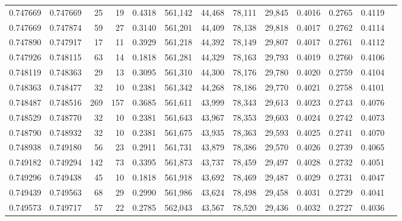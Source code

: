 \begin{tabular}{rrrrrrrrrrrrr}
0.747669 & 0.747669 &    25 &  19 &                                     0.4318 & 561,142 &  44,468 &  78,111 &  29,845 & 0.4016 & 0.2765 & 0.4119 \\
0.747669 & 0.747874 &    59 &  27 &                                     0.3140 & 561,201 &  44,409 &  78,138 &  29,818 & 0.4017 & 0.2762 & 0.4114 \\
0.747890 & 0.747917 &    17 &  11 &                                     0.3929 & 561,218 &  44,392 &  78,149 &  29,807 & 0.4017 & 0.2761 & 0.4112 \\
0.747926 & 0.748115 &    63 &  14 &                                     0.1818 & 561,281 &  44,329 &  78,163 &  29,793 & 0.4019 & 0.2760 & 0.4106 \\
0.748119 & 0.748363 &    29 &  13 &                                     0.3095 & 561,310 &  44,300 &  78,176 &  29,780 & 0.4020 & 0.2759 & 0.4104 \\
0.748363 & 0.748477 &    32 &  10 &                                     0.2381 & 561,342 &  44,268 &  78,186 &  29,770 & 0.4021 & 0.2758 & 0.4101 \\
0.748487 & 0.748516 &   269 & 157 &                                     0.3685 & 561,611 &  43,999 &  78,343 &  29,613 & 0.4023 & 0.2743 & 0.4076 \\
0.748529 & 0.748770 &    32 &  10 &                                     0.2381 & 561,643 &  43,967 &  78,353 &  29,603 & 0.4024 & 0.2742 & 0.4073 \\
0.748790 & 0.748932 &    32 &  10 &                                     0.2381 & 561,675 &  43,935 &  78,363 &  29,593 & 0.4025 & 0.2741 & 0.4070 \\
0.748938 & 0.749180 &    56 &  23 &                                     0.2911 & 561,731 &  43,879 &  78,386 &  29,570 & 0.4026 & 0.2739 & 0.4065 \\
0.749182 & 0.749294 &   142 &  73 &                                     0.3395 & 561,873 &  43,737 &  78,459 &  29,497 & 0.4028 & 0.2732 & 0.4051 \\
0.749296 & 0.749438 &    45 &  10 &                                     0.1818 & 561,918 &  43,692 &  78,469 &  29,487 & 0.4029 & 0.2731 & 0.4047 \\
0.749439 & 0.749563 &    68 &  29 &                                     0.2990 & 561,986 &  43,624 &  78,498 &  29,458 & 0.4031 & 0.2729 & 0.4041 \\
0.749573 & 0.749717 &    57 &  22 &                                     0.2785 & 562,043 &  43,567 &  78,520 &  29,436 & 0.4032 & 0.2727 & 0.4036 \\

\end{tabular}
